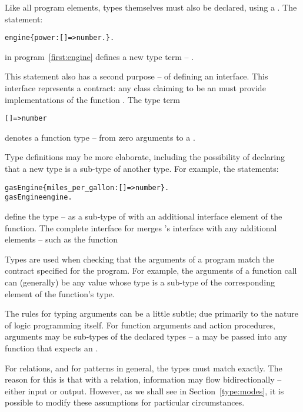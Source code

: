 Like all program elements, types themselves must also be declared, using a . The statement:
\begin{alltt}
engine \typearrow \{ power:[]=>number. \}.
\end{alltt}
in program~\vref{first:engine} defines a new type term -- . 

This statement also has a second purpose -- of defining an interface. This interface represents a contract: any class claiming to be an  must provide implementations of the function . The type term
\begin{alltt}
[]=>number
\end{alltt}
denotes a function type -- from zero arguments to a .

Type definitions may be more elaborate, including the possibility of declaring that a new type is a sub-type of another type. For example, the statements:
\begin{alltt}
gasEngine \typearrow \{ miles\_per\_gallon:[]=>number \}.
gasEngine \typearrow engine.
\end{alltt} 
define the  type -- as a sub-type of  with an additional interface element of the  function. The complete interface for  merges 's interface with any additional elements -- such as the  function

Types are used when checking that the arguments of a program match the contract specified for the program. For example, the arguments of a function call can (generally) be any value whose type is a sub-type of the corresponding element of the function's type.

\begin{aside}
The rules for typing arguments can be a little subtle; due primarily to the nature of logic programming itself. For function arguments and action procedures, arguments may be sub-types of the declared types -- a  may be passed into any function that expects an . 

For relations, and for patterns in general, the types must match exactly. The reason for this is that with a relation, information may flow bidirectionally -- either input or output. However, as we shall see in Section~\vref{type:modes}, it is possible to modify these assumptions for particular circumstances.
\end{aside}


